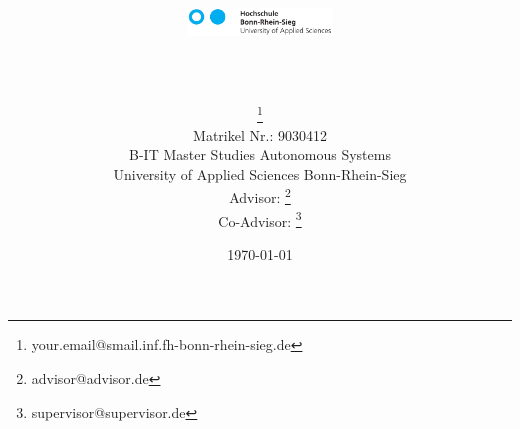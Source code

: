 \title{\includegraphics[height=0.75cm]{./logos/logo_hbrs.png}\\\PaperTitle\\\PaperSubject}
\author{\href{\PaperMainWriterEMail}{\PaperMainWriter \footnote{\href{\PaperMainWriterEMail} {your.email@smail.inf.fh-bonn-rhein-sieg.de}} 
}\\%
Matrikel Nr.: 9030412 \vspace{0.5cm} \\ 
B-IT Master Studies Autonomous Systems \vspace{0.5cm} \\ 
University of Applied Sciences Bonn-Rhein-Sieg\vspace{0.7cm} \\ \setcounter{footnote}{6}
Advisor: \href{\PaperLecturerEMail}{\PaperLecturer \footnote{\href{\PaperLecturerEMail} {advisor@advisor.de}}} \\ 
Co-Advisor: \href{\PaperSupervisorEMail}{\PaperSupervisor \footnote{\href{\PaperSupervisorEMail} {supervisor@supervisor.de}}} \\ 
}
\date{\today}
\maketitle
